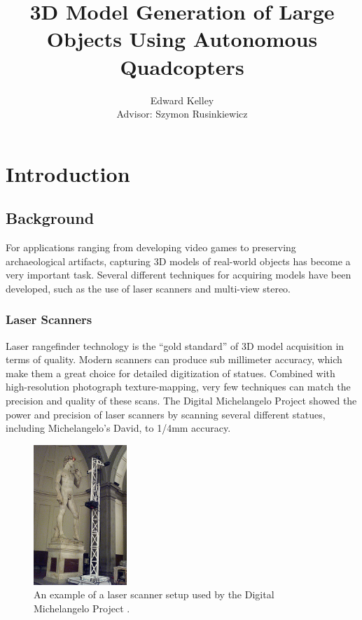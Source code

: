 \documentclass[pageno]{jpaper}
\begin{document}
\title{3D Model Generation of Large Objects Using Autonomous Quadcopters}
\author{Edward Kelley \\
        Advisor: Szymon Rusinkiewicz
}

\date{}
\maketitle

\thispagestyle{empty}


\section{Introduction}

\subsection{Background}

For applications ranging from developing video games to preserving archaeological artifacts, capturing 3D models of real-world objects has become a very important task. Several different techniques for acquiring models have been developed, such as the use of laser scanners and multi-view stereo.

\subsubsection{Laser Scanners}
Laser rangefinder technology is the ``gold standard'' of 3D model acquisition in terms of quality. Modern scanners can produce sub millimeter accuracy, which make them a great choice for detailed digitization of statues. Combined with high-resolution photograph texture-mapping, very few techniques can match the precision and quality of these scans. The Digital Michelangelo Project showed the power and precision of laser scanners by scanning several different statues, including Michelangelo's David, to 1/4mm accuracy.\cite{Levoy}

\begin{figure}
\centering
\includegraphics[height=200px]{../images/david_scan.jpg}
\caption{An example of a laser scanner setup used by the Digital Michelangelo Project \cite{Levoy}.}
\end{figure}
\end{document}
